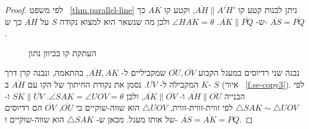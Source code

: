 \begin{proof}
לפי משפט%
~\ref{thm.parallel-line}
ניתן לבנות קטע קו
$\overline{AH}\|\overline{A'H'}$,
וקטע קו
$\overline{AK}$
כך ש-%
$\overline{AK}\|\overline{PQ}$.
$\angle HAK=\theta$
ולכן מה שנשאר הוא למצוא נקודה
$S$
על
$\overline{AH}$
כך ש-%
$\overline{AS}=\overline{PQ}$.
\begin{figure}[tb]
\begin{center}
\end{center}
\caption{העתקת קו בכיוון נתון}\label{f.se-copy1}
\end{figure}

נבנה שני רדיוסים במעגל הקבוע 
$\overline{OU},\overline{OV}$
שמקביליים ל-%
$\overline{AH},\overline{AK}$,
בהתאמה, ונבנה קרן דרך
$K$
המקבילה ל-%
$\overline{UV}$.
נסמן את נקודת החיתוך של הקו עם
$\overline{AH}$
ב-%
$S$
(איור%
~\ref{f.se-copy3}).
לפי הבנייה
$\overline{AH}\|\overline{OU}$
ו-%
$\overline{AK}\|\overline{OV}$,
ולכן
$\angle SAK=\angle UOV=\theta$.
$\overline{SK}\|\overline{UV}$
ו-%
$\triangle SAK\sim \triangle UOV$
לפי זווית-זווית-זווית,
$\triangle UOV$
הוא שווה-שוקיים כי
$\overline{OU}$, $\overline{OV}$
הם רדיוסים של אותו מעגל. מכאן ש-%
$\triangle SAK$
הוא שווה-שוקיים ו-%
$\overline{AS}=\overline{AK}=\overline{PQ}$.
\end{proof}

